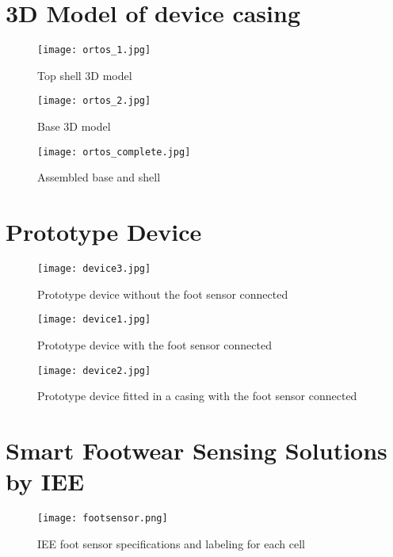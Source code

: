 \chapter{3D Model of device casing}
\makeatletter{}\makeatother
\label{appen:3dmodel}

\begin{figure}[!htb]
  \centering
  \texttt{[image: ortos\_1.jpg]}
  \caption{Top shell 3D model}
  \label{fig:CustomTableLayout}
\end{figure}

\begin{figure}[!htb]
  \centering
  \texttt{[image: ortos\_2.jpg]}
  \caption{Base 3D model}
  \label{fig:CustomTableLayout}
\end{figure}

\begin{figure}[!htb]
  \centering
  \texttt{[image: ortos\_complete.jpg]}
  \caption{Assembled base and shell}
  \label{fig:CustomTableLayout}
\end{figure}

\chapter{Prototype Device}
\makeatletter{}\makeatother
\label{appen:prototype}

\begin{figure}[!htb]
  \centering
  \texttt{[image: device3.jpg]}
  \caption{Prototype device without the foot sensor connected}
  \label{fig:CustomTableLayout}
\end{figure}

\begin{figure}[!htb]
  \centering
  \texttt{[image: device1.jpg]}
  \caption{Prototype device with the foot sensor connected}
  \label{fig:CustomTableLayout}
\end{figure}

\begin{figure}[!htb]
  \centering
  \texttt{[image: device2.jpg]}
  \caption{Prototype device fitted in a casing with the foot sensor connected}
  \label{fig:CustomTableLayout}
\end{figure}

\chapter{Smart Footwear Sensing Solutions by IEE}
\makeatletter{}\makeatother
\label{appen:footweardevice}

\begin{figure}[!htb]
  \centering
  \texttt{[image: footsensor.png]}
  \caption{IEE foot sensor specifications and labeling for each cell}
  \label{fig:footsensordevice}
\end{figure}

